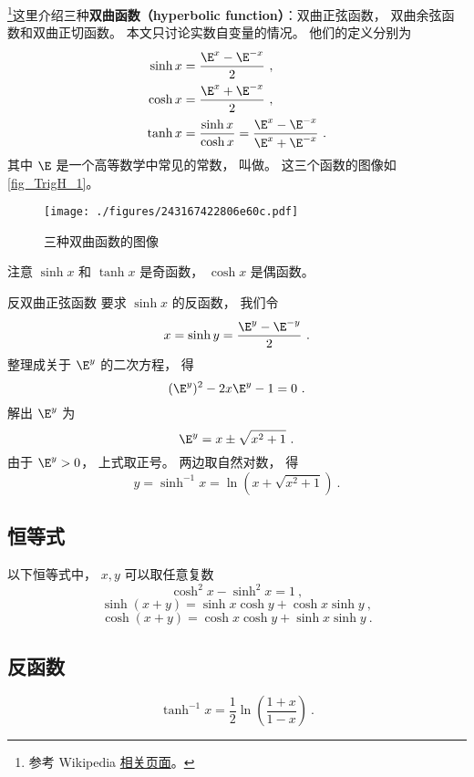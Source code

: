 

\footnote{参考 Wikipedia \href{https://en.wikipedia.org/wiki/Hyperbolic_functions}{相关页面}。}这里介绍三种\textbf{双曲函数（hyperbolic function）}：双曲正弦函数， 双曲余弦函数和双曲正切函数。 本文只讨论实数自变量的情况。 他们的定义分别为
\begin{align}
\sinh x &= \frac{\E^x - \E^{-x}}{2}~,\\
\label{eq_TrigH_1}
\cosh x &= \frac{\E^x + \E^{-x}}{2}~,\\
\tanh x &= \frac{\sinh x}{\cosh x} = \frac{\E^x - \E^{-x}}{\E^x + \E^{-x}}~.
\end{align}
其中 $\E$ 是一个高等数学中常见的常数， 叫做。 这三个函数的图像如\autoref{fig_TrigH_1}。

\begin{figure}[ht]
\centering
\texttt{[image: ./figures/243167422806e60c.pdf]}
\caption{三种双曲函数的图像} \label{fig_TrigH_1}
\end{figure}

注意 $\sinh x$ 和 $\tanh x$ 是奇函数， $\cosh x$ 是偶函数。

\begin{example}{反双曲正弦函数}\label{ex_TrigH_1}
要求 $\sinh x$ 的反函数， 我们令
\begin{equation}
x = \sinh y =  \frac{\E^y - \E^{-y}}{2}~.
\end{equation}
整理成关于 $\E^y$ 的二次方程， 得
\begin{equation}
(\E^y)^2 - 2x \E^y - 1 = 0~.
\end{equation}
解出 $\E^y$ 为
\begin{equation}
\E^y = x \pm \sqrt{x^2 + 1}~.
\end{equation}
由于 $\E^y > 0$， 上式取正号。 两边取自然对数， 得
\begin{equation}
y = \sinh^{-1} x = \ln(x + \sqrt{x^2 + 1})~.
\end{equation}
\end{example}

\subsection{恒等式}
以下恒等式中， $x,y$ 可以取任意复数
\begin{equation}
\cosh^2 x - \sinh^2 x = 1~,
\end{equation}
\begin{equation}
\sinh(x+y) = \sinh x \cosh y + \cosh x \sinh y~,
\end{equation}
\begin{equation}
\cosh(x+y) = \cosh x \cosh y + \sinh x \sinh y~.
\end{equation}

\subsection{反函数}

\begin{equation}\label{eq_atanh}
\tanh^{-1} x = \frac12 \ln(\frac{1+x}{1-x})~.
\end{equation}

